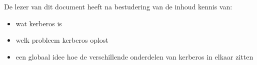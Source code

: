 De lezer van dit document heeft na bestudering van de inhoud kennis van:
\begin{itemize}
\item wat kerberos is
\item welk probleem kerberos oplost
\item een globaal idee hoe de verschillende onderdelen van kerberos in elkaar zitten
\end{itemize}
